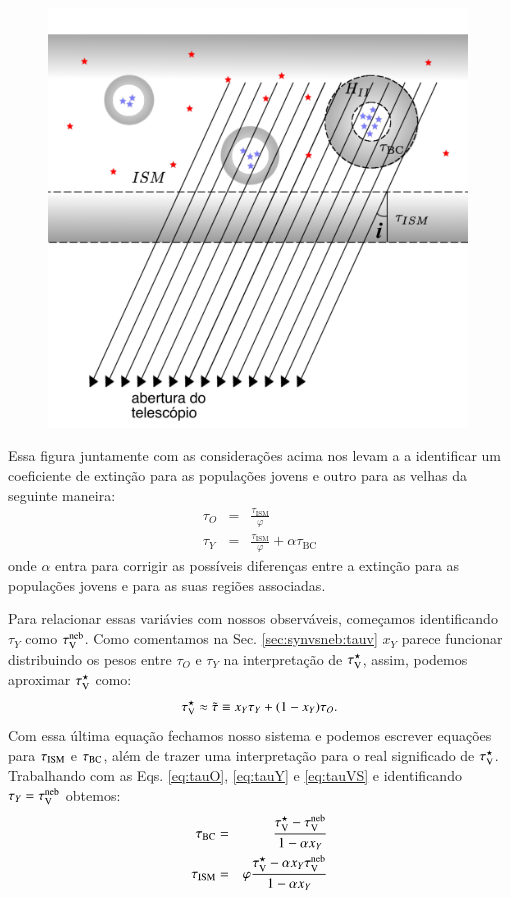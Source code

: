 \begin{figure}
	\includegraphics[width=0.99\textwidth]{figuras/Hiiregion_model.pdf          }
	\caption[Modelo para extinção diferencial.]
	{}
	\label{fig:model}
\end{figure}

Essa figura juntamente com as considerações acima nos levam a a identificar um coeficiente de
extinção para as populações jovens e outro para as velhas da seguinte maneira:
\begin{eqnarray}
	\tau_O &=& \frac{\tau_{\mathrm{ISM}}}{\varphi} \\
	\label{eq:tauO}
	\tau_Y &=& \frac{\tau_{\mathrm{ISM}}}{\varphi} + \alpha\tau_{\mathrm{BC}}
	\label{eq:tauY} 
\end{eqnarray}
\noindent onde $\alpha$ entra para corrigir as possíveis diferenças entre a extinção para as
populações jovens e para as suas regiões \Hii associadas.

Para relacionar essas variávies com nossos observáveis, começamos identificando $\tau_Y$ como
$\tau_{\mathrm{V}}^{\mathrm{neb}}$. Como comentamos na Sec. \ref{sec:synvsneb:tauv} $x_Y$ parece funcionar distribuindo os
pesos entre $\tau_O$ e $\tau_Y$ na interpretação de $\tau_{\mathrm{V}}^\star$, assim, podemos aproximar $\tau_{\mathrm{V}}^\star$
como:
\begin{equation}
	\tau_{\mathrm{V}}^\star \approx \tilde{\tau} \equiv x_Y \tau_Y + (1 - x_Y) \tau_O.
	\label{eq:tauVS}
\end{equation}
Com essa última equação fechamos nosso sistema e podemos escrever equações para $\tau_{\mathrm{ISM}}$ e
$\tau_{\mathrm{BC}}$, além de trazer uma interpretação para o real significado de $\tau_{\mathrm{V}}^\star$. Trabalhando com as
Eqs. \ref{eq:tauO}, \ref{eq:tauY} e \ref{eq:tauVS} e identificando $\tau_Y = \tau_{\mathrm{V}}^{\mathrm{neb}}$ obtemos:  
\begin{eqnarray}
	\tau_{\mathrm{BC}} &=& \frac{\tau_{\mathrm{V}}^\star - \tau_{\mathrm{V}}^{\mathrm{neb}}}{1 - \alpha x_Y} \\
	\label{eq:tauBC}
	\tau_{\mathrm{ISM}} &=& \varphi\frac{\tau_{\mathrm{V}}^\star - \alpha x_Y \tau_{\mathrm{V}}^{\mathrm{neb}}}{1 - \alpha x_Y}  
	\label{eq:tauISM}
\end{eqnarray}

